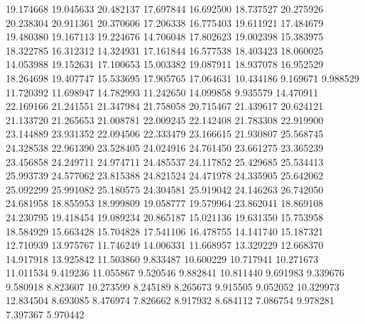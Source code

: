 19.174668
19.045633
20.482137
17.697844
16.692500
18.737527
20.275926
20.238304
20.911361
20.370606
17.206338
16.775403
19.611921
17.484679
19.480380
19.167113
19.224676
14.706048
17.802623
19.002398
15.383975
18.322785
16.312312
14.324931
17.161844
16.577538
18.403423
18.060025
14.053988
19.152631
17.100653
15.003382
19.087911
18.937078
16.952529
18.264698
19.407747
15.533695
17.905765
17.064631
10.434186
9.169671
9.988529
11.720392
11.698947
14.782993
11.242650
14.099858
9.935579
14.470911
22.169166
21.241551
21.347984
21.758058
20.715467
21.439617
20.624121
21.133720
21.265653
21.008781
22.009245
22.142408
21.783308
22.919900
23.144889
23.931352
22.094506
22.333479
23.166615
21.930807
25.568745
24.328538
22.961390
23.528405
24.024916
24.761450
23.661275
23.365239
23.456858
24.249711
24.974711
24.485537
24.117852
25.429685
25.534413
25.993739
24.577062
23.815388
24.821524
24.471978
24.335905
25.642062
25.092299
25.991082
25.180575
24.304581
25.919042
24.146263
26.742050
24.681958
18.855953
18.999809
19.058777
19.579964
23.862041
18.869108
24.230795
19.418454
19.089234
20.865187
15.021136
19.631350
15.753958
18.584929
15.663428
15.704828
17.541106
16.478755
14.141740
15.187321
12.710939
13.975767
11.746249
14.006331
11.668957
13.329229
12.668370
14.917918
13.925842
11.503860
9.833487
10.600229
10.717941
10.271673
11.011534
9.419236
11.055867
9.520546
9.882841
10.811440
9.691983
9.339676
9.580918
8.823607
10.273599
8.245189
8.265673
9.915505
9.052052
10.329973
12.834504
8.693085
8.476974
7.826662
8.917932
8.684112
7.086754
9.978281
7.397367
5.970442
